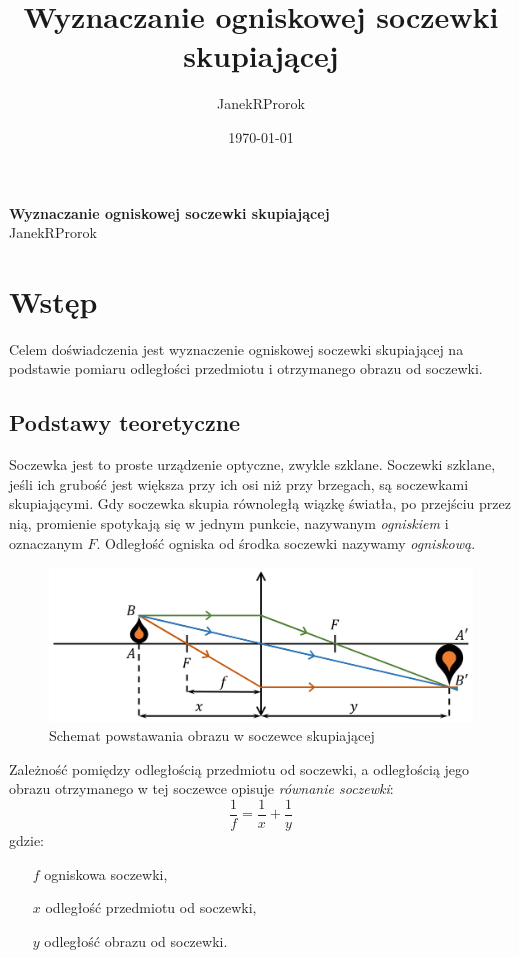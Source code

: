 \documentclass[11pt,oneside,final,notitlepage,a4paper,wide]{mwart}
\title{Wyznaczanie ogniskowej soczewki skupiającej}
\author{JanekR\underline{\hspace{0.2cm}}Prorok}
\date{\today}
\begin{document}
%
	\begin{center}
	 	\LARGE{\textbf{Wyznaczanie ogniskowej soczewki skupiającej}}\\ \medskip
 		\small{JanekR\underline{\hspace{0.2cm}}Prorok}
	\end{center}
\section{Wstęp}
	Celem doświadczenia jest wyznaczenie ogniskowej soczewki skupiającej na podstawie pomiaru odległości przedmiotu i otrzymanego obrazu od soczewki.
%
	\subsection{Podstawy teoretyczne}
		Soczewka jest to proste urządzenie optyczne, zwykle szklane. Soczewki szklane, jeśli ich grubość jest większa przy ich osi niż przy brzegach, są soczewkami skupiającymi. Gdy soczewka skupia równoległą wiązkę światła, po przejściu przez nią, promienie spotykają się w jednym punkcie, nazywanym \emph{ogniskiem} i oznaczanym $F$. Odległość ogniska od środka soczewki nazywamy \emph{ogniskową}.
		\begin{figure}[h]
			\centering
			\includegraphics[width=\textwidth]{rys/schemat_powstawania_obrazu.png}
			\caption{Schemat powstawania obrazu w soczewce skupiającej}
		\end{figure}
	
		Zależność pomiędzy odległością przedmiotu od soczewki, a odległością jego obrazu otrzymanego w tej soczewce opisuje \emph{równanie soczewki}:
		\begin{equation}
			\frac{1}{f} = \frac{1}{x} + \frac{1}{y}
		\end{equation}
		gdzie:
		\begin{itemize}		
			\item[$f$] ogniskowa soczewki,
			\item[$x$] odległość przedmiotu od soczewki,
			\item[$y$] odległość obrazu od soczewki.
		\end{itemize} \smallskip
	
\end{document}
